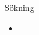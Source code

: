 

\ifkompendium\else

\begin{Slide}{Sökning}\SlideFontSmall
\begin{itemize}
\item 
\end{itemize}

\end{Slide}


\fi











